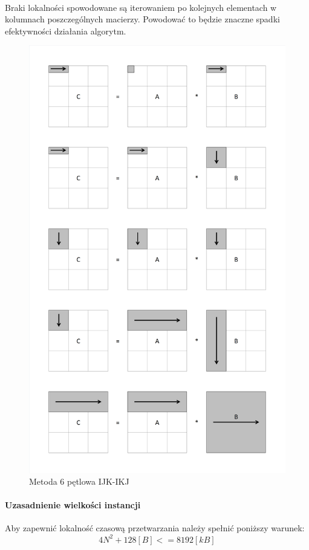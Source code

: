 \documentclass{scrartcl}
\begin{document}
\paragraph{}Braki lokalności spowodowane są iterowaniem po kolejnych elementach w kolumnach poszczególnych macierzy. Powodować to będzie znaczne spadki efektywności działania algorytm.
\begin{figure}[H]
\includegraphics[width=\textwidth]{6petlowa.png}
\caption{Metoda 6 pętlowa IJK-IKJ}
\end{figure}
\paragraph{Uzasadnienie wielkości instancji} Aby zapewnić lokalność czasową przetwarzania należy spełnić poniższy warunek:
\begin{equation}
4N ^ 2 + 128 [B] <= 8192 [kB]
\end{equation}
\end{document}
